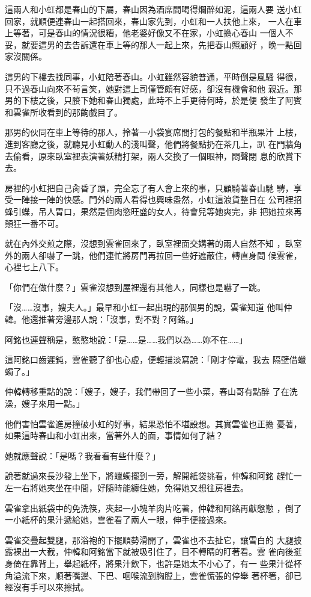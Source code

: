 這兩人和小虹都是春山的下屬，春山因為酒席間喝得爛醉如泥，這兩人要
送小虹回家，就順便連春山一起搭回來，春山家先到，小虹和一人扶他上來，
一人在車上等著，可是春山的情況很糟，他老婆好像又不在家，小虹擔心春山
一個人不妥，就要這男的去告訴還在車上等的那人一起上來，先把春山照顧好
，晚一點回家沒關係。

這男的下樓去找同事，小虹陪著春山。小虹雖然容貌普通，平時倒是風騷
得很，只不過春山向來不茍言笑，她對這上司僅管頗有好感，卻沒有機會和他
親近。那男的下樓之後，只賸下她和春山獨處，此時不上手更待何時，於是便
發生了阿賓和雲雀所收看到的那齣戲目了。

那男的伙同在車上等待的那人，拎著一小袋宴席間打包的餐點和半瓶果汁
上樓，進到客廳之後，就聽見小虹動人的淺叫聲，他們將餐點扔在茶几上，趴
在門牆角去偷看，原來臥室裡表演著妖精打架，兩人交換了一個眼神，悶聲閉
息的欣賞下去。

房裡的小虹把自己肏昏了頭，完全忘了有人會上來的事，只顧騎著春山馳
騁，享受一陣接一陣的快感。門外的兩人看得也興味盎然，小虹這浪貨整日在
公司裡招蜂引蝶，吊人胃口，果然是個肉慾旺盛的女人，待會兒等她爽完，非
把她拉來再顛狂一番不可。

就在內外交煎之際，沒想到雲雀回來了，臥室裡面交媾著的兩人自然不知
，臥室外的兩人卻嚇了一跳，他們連忙將房門再拉回一些好遮蔽住，轉直身問
候雲雀，心裡七上八下。

「你們在做什麼？」雲雀沒想到屋裡還有其他人，同樣也是嚇了一跳。

「沒……沒事，嫂夫人。」最早和小虹一起出現的那個男的說，雲雀知道
他叫仲韓。他還推著旁邊那人說：「沒事，對不對？阿銘。」

阿銘也連聲稱是，憨憨地說：「是……是……我們以為……妳不在……」

這阿銘口齒遲鈍，雲雀聽了卻也心虛，便輕描淡寫說：「剛才停電，我去
隔壁借蠟蠋了。」

仲韓轉移重點的說：「嫂子，嫂子，我們帶回了一些小菜，春山哥有點醉
了在洗澡，嫂子來用一點。」

他們害怕雲雀進房撞破小虹的好事，結果恐怕不堪設想。其實雲雀也正擔
憂著，如果這時春山和小虹出來，當著外人的面，事情如何了結？

她就應聲說：「是嗎？我看看有些什麼？」

說著就過來長沙發上坐下，將蠟蠋擺到一旁，解開紙袋挑看，仲韓和阿銘
趕忙一左一右將她夾坐在中間，好隨時能纏住她，免得她又想往房裡去。

雲雀拿出紙袋中的免洗筷，夾起一小塊羊肉片吃著，仲韓和阿銘再獻慇懃
，倒了一小紙杯的果汁遞給她，雲雀看了兩人一眼，伸手便接過來。

雲雀交疊起雙腿，那浴袍的下擺順勢滑開了，雲雀也不去扯它，讓雪白的
大腿披露裸出一大截，仲韓和阿銘當下就被吸引住了，目不轉睛的盯著看。雲
雀向後挺身倚在靠背上，舉起紙杯，將果汁飲下，也許是她太不小心了，有一
些果汁從杯角溢流下來，順著嘴邊、下巴、咽喉流到胸膛上，雲雀慌張的停舉
著杯箸，卻已經沒有手可以來擦拭。

